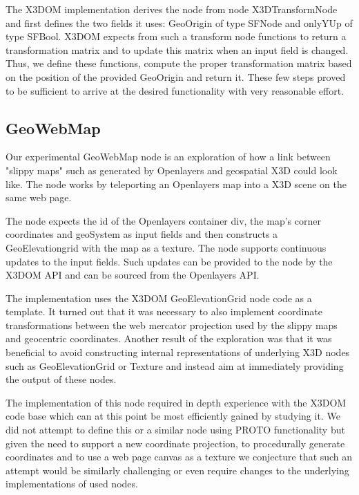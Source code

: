 \documentclass[review]{acmsiggraph}            %
\begin{document}
The X3DOM implementation derives the node from node X3DTransformNode and first defines the two fields it uses: GeoOrigin of type SFNode and onlyYUp of type SFBool. X3DOM expects from such a transform node functions to return a transformation matrix and to update this matrix when an input field is changed. Thus, we define these functions, compute the proper transformation matrix based on the position of the provided GeoOrigin and return it. These few steps proved to be sufficient to arrive at the desired functionality with very reasonable effort.

\subsection{GeoWebMap}

Our experimental GeoWebMap node is an exploration of how a link between "slippy maps" such as generated by Openlayers \cite{OL15} and geospatial X3D could look like. The node works by teleporting an Openlayers map into a X3D scene on the same web page.

The node expects the id of the Openlayers container div, the map's corner coordinates and geoSystem as input fields and then constructs a GeoElevationgrid with the map as a texture. The node supports continuous updates to the input fields. Such updates can be provided to the node by the X3DOM API and can be sourced from the Openlayers API.

The implementation uses the X3DOM GeoElevationGrid node code as a template. It turned out that it was necessary to also implement coordinate transformations between the web mercator projection used by the slippy maps and geocentric coordinates. Another result of the exploration was that it was beneficial to avoid constructing internal representations of underlying X3D nodes such as GeoElevationGrid or Texture and instead aim at immediately providing the output of these nodes.

The implementation of this node required in depth experience with the X3DOM code base which can at this point be most efficiently gained by studying it. We did not attempt to define this or a similar node using PROTO functionality but given the need to support a new coordinate projection, to procedurally generate coordinates and to use a web page canvas as a texture we conjecture that such an attempt would be similarly challenging or even require changes to the underlying implementations of used nodes.  
\end{document}
